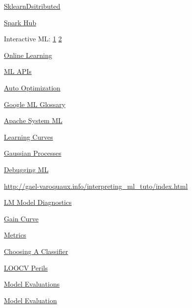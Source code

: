 \documentclass[]{book}
\begin{document}
\href{https://alexperrier.github.io/jekyll/update/2016/03/16/out-of-core-scikit-boston-meetup.html\#/}{SklearnDsitributed}

\href{https://sparkhub.databricks.com/}{Spark Hub}

Interactive ML:
\href{https://channel9.msdn.com/Events/useR-international-R-User-conference/useR2016/Interactive-Naive-Bayes-using-Shiny-Text-Retrieval-Classification-Quantification}{1}
\textbar{}
\href{https://nuit-blanche.blogspot.com/2017/02/saturday-morning-videos-interactive.html}{2}

\href{http://scikit-learn.org/stable/modules/generated/sklearn.linear_model.PassiveAggressiveRegressor.html}{Online
Learning}

\href{http://www.kdnuggets.com/2015/12/machine-learning-data-science-apis.html}{ML
APIs}

\href{https://sigopt.com/}{Auto Optimization}

\href{https://developers.google.com/machine-learning/glossary/}{Google
ML Glossary}

\href{https://systemml.apache.org}{Apache System ML}

\href{http://www.ritchieng.com/machinelearning-learning-curve/}{Learning
Curves}

\href{http://scikit-learn.org/stable/modules/gaussian_process.html}{Gaussian
Processes}

\href{http://nlpers.blogspot.com/2016/08/debugging-machine-learning.html}{Debugging
ML}

\url{http://gael-varoquaux.info/interpreting_ml_tuto/index.html}

\href{http://mpastell.com/2013/04/19/python_regression/}{LM Model
Diagnostics}

\href{https://www.rdocumentation.org/packages/WVPlots/versions/0.2.6/topics/GainCurvePlot}{Gain
Curve}

\href{https://www.analyticsvidhya.com/blog/2016/02/7-important-model-evaluation-error-metrics/}{Metrics}

\href{http://blog.echen.me/2011/04/27/choosing-a-machine-learning-classifier/}{Choosing
A Classifier}

\href{http://www.russpoldrack.org/2012/12/the-perils-of-leave-one-out.html}{LOOCV
Perils}

\href{http://www.win-vector.com/blog/2016/12/be-careful-evaluating-model-predictions/}{Model
Evaluations}

\href{http://blog.dato.com/how-to-evaluate-machine-learning-models-part-1-orientation}{Model
Evaluation}
\end{document}
